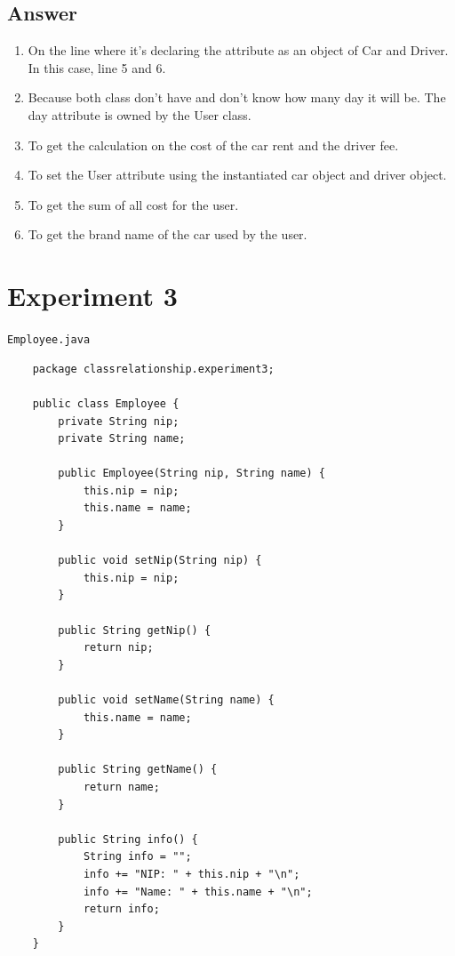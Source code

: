 \documentclass[12pt,titlepage]{article}
\begin{document}
\subsection{Answer}
\begin{enumerate}
    \item On the line where it's declaring the attribute as an object of Car and Driver. In this case, line 5 and 6.
    \item Because both class don't have and don't know how many day it will be. The day attribute is owned by the User class.
    \item To get the calculation on the cost of the car rent and the driver fee.
    \item To set the User attribute using the instantiated car object and driver object.
    \item To get the sum of all cost for the user.
    \item To get the brand name of the car used by the user.
\end{enumerate}

\newpage
\section{Experiment 3}

\noindent \texttt{Employee.java}
\begin{verbatim}
    package classrelationship.experiment3;

    public class Employee {
        private String nip;
        private String name;

        public Employee(String nip, String name) {
            this.nip = nip;
            this.name = name;
        }

        public void setNip(String nip) {
            this.nip = nip;
        }

        public String getNip() {
            return nip;
        }

        public void setName(String name) {
            this.name = name;
        }

        public String getName() {
            return name;
        }

        public String info() {
            String info = "";
            info += "NIP: " + this.nip + "\n";
            info += "Name: " + this.name + "\n";
            return info;
        }
    }
\end{verbatim}
\end{document}
